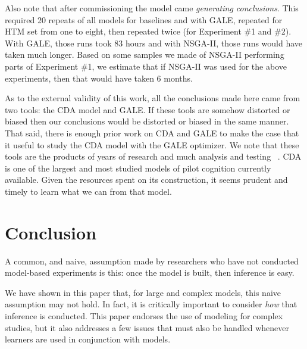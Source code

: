 \documentclass[journal]{IEEEtran}
\newcommand{\tion}[1]{\textsection\ref{sec:#1}}
\begin{document}
Also note that after commissioning the model came {\em generating conclusions}.
This required 20 repeats of all models for baselines and with GALE, repeated for HTM set from one to eight, then repeated twice (for Experiment \#1 and \#2). 
With GALE, those runs took 83 hours and with NSGA-II, those runs would have taken much longer.
Based on some samples we made of NSGA-II performing parts of Experiment \#1, we estimate that if NSGA-II was used for the above experiments, then that would have taken 6 months.


As to the external validity of this work,
all the conclusions made here came from two tools: the CDA model and GALE. 
If these tools are somehow distorted or biased then our conclusions would be distorted or biased in the same manner.
That said,
there is enough  prior work on CDA and GALE  to make the case that it useful to study the CDA model with the GALE optimizer.
We note that these tools are the products of years of research and much analysis and testing ~\cite{Kim2011,Pritchett2011,Feigh2012,Kim2013,Pritchett2013,Pritchett2014, Feigh 2014,krall14aaai,krallphd,galepaper}. 
CDA is one of the largest and most studied models of pilot cognition currently available.  
Given the resources spent on its construction, it seems prudent and timely to learn what we can from that model.





\section{Conclusion}

A common, and naive, assumption made by researchers who have not conducted model-based experiments is this: once the model is built, then inference is easy.

We have shown in this paper that, for large and complex models, this naive assumption may not hold.
In fact, it is critically important to consider {\em how} that inference is conducted.
This paper endorses the use of modeling for complex studies, but it also addresses a few issues that must also be handled whenever learners are used in conjunction with models.  
\end{document}
